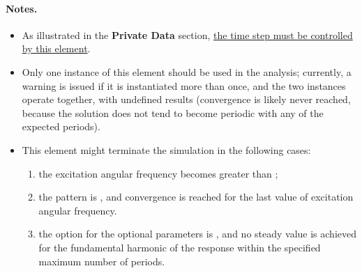 \paragraph{Notes.}
\begin{itemize}
\item As illustrated in the \textbf{Private Data}  section, \underline{the time step must be controlled by this element}.

\item Only one instance of this element should be used in the analysis; currently, a warning is issued if it is instantiated more than once, and the two instances operate together, with undefined results (convergence is likely never reached, because the solution does not tend to become periodic with any of the expected periods).

\item This element might terminate the simulation in the following cases:
\begin{enumerate}[label=\alph*)] %
\item the excitation angular frequency becomes greater than ;
\item the  pattern is , and convergence is reached for the last value of excitation angular frequency.
\item the  option for the  optional parameters is , and no steady value is achieved for the fundamental harmonic of the response within the specified maximum number of periods.
\end{enumerate} %
\end{itemize}

